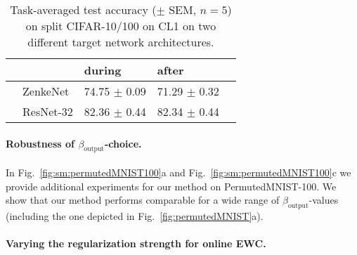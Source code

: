 \documentclass{article}
\begin{document}
\begin{table*}[ht!]
 \centering
  \caption{Task-averaged test accuracy ($\pm$ SEM, $n=5$) on split CIFAR-10/100 on CL1 on two different target network architectures.}
  \begin{small}
  \begin{tabular}{llp{1.62cm}p{2cm}p{2cm}} \toprule
     & & \textbf{during} & \textbf{after} \\ \midrule \midrule
    \multirow{3}{*}{}
    & ZenkeNet & 74.75 $\pm$ 0.09 & 71.29 $\pm$ 0.32  \\
    &  ResNet-32 & 82.36 $\pm$ 0.44 & 82.34 $\pm$ 0.44 \\
    \bottomrule
  \end{tabular}
  \label{tab:cifar-acc-quantification}
  \end{small}
\end{table*}

\paragraph{Robustness of $\beta_\text{output}$-choice.}

In Fig.~\ref{fig:sm:permutedMNIST100}a and Fig.~\ref{fig:sm:permutedMNIST100}c we provide additional experiments for our method on PermutedMNIST-100. We show that our method performs comparable for a wide range of $\beta_\text{output}$-values (including the one depicted in Fig.~\ref{fig:permutedMNIST}a).

\paragraph{Varying the regularization strength for online EWC.}
\end{document}
